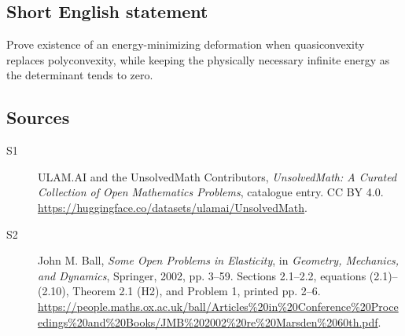 \documentclass[11pt]{book}
\begin{document}
\subsection{Short English statement}
Prove existence of an energy-minimizing deformation when quasiconvexity replaces polyconvexity, while keeping the physically necessary infinite energy as the determinant tends to zero.
\subsection{Sources}
\begin{description}
\item[\hypertarget{source:statement:1}{S1}] ULAM.AI and the UnsolvedMath Contributors, \emph{UnsolvedMath: A Curated Collection of Open Mathematics Problems}, catalogue entry. CC BY 4.0. \url{https://huggingface.co/datasets/ulamai/UnsolvedMath}.
\item[\hypertarget{source:statement:2}{S2}] John M. Ball, \emph{Some Open Problems in Elasticity}, in \emph{Geometry, Mechanics, and Dynamics}, Springer, 2002, pp. 3--59. Sections 2.1--2.2, equations (2.1)--(2.10), Theorem 2.1 (H2), and Problem 1, printed pp. 2--6. \url{https://people.maths.ox.ac.uk/ball/Articles%20in%20Conference%20Proceedings%20and%20Books/JMB%202002%20re%20Marsden%2060th.pdf}.
\end{description}
\label{end:statement}
\end{document}
